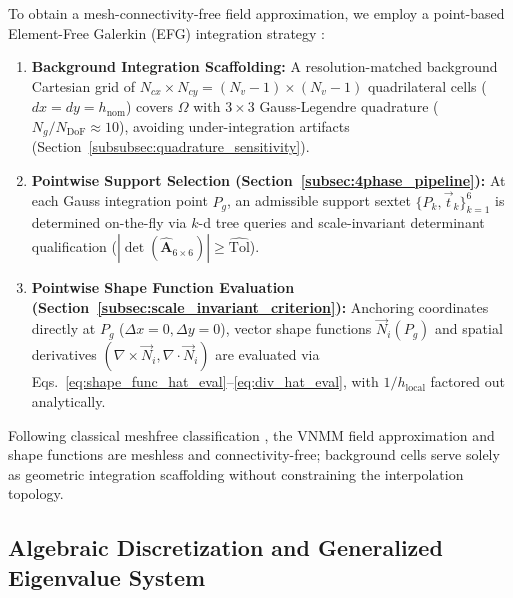 \documentclass[preprint,12pt]{elsarticle}
\begin{document}
To obtain a mesh-connectivity-free field approximation, we employ a point-based Element-Free Galerkin (EFG) integration strategy \cite{belytschko1994element, parreira2006efficient}:
\begin{enumerate}
    \item \textbf{Background Integration Scaffolding:} A resolution-matched background Cartesian grid of $N_{cx} \times N_{cy} = (N_v - 1) \times (N_v - 1)$ quadrilateral cells ($dx = dy = h_{\mathrm{nom}}$) covers $\Omega$ with $3 \times 3$ Gauss-Legendre quadrature ($N_g / N_{\mathrm{DoF}} \approx 10$), avoiding under-integration artifacts (Section~\ref{subsubsec:quadrature_sensitivity}).
    \item \textbf{Pointwise Support Selection (Section~\ref{subsec:4phase_pipeline}):} At each Gauss integration point $P_g$, an admissible support sextet $\{P_k, \vec{t}_k\}_{k=1}^6$ is determined on-the-fly via $k$-d tree queries and scale-invariant determinant qualification ($|\det(\widehat{\mathbf{A}}_{6 \times 6})| \ge \widehat{\mathrm{Tol}}$).
    \item \textbf{Pointwise Shape Function Evaluation (Section~\ref{subsec:scale_invariant_criterion}):} Anchoring coordinates directly at $P_g$ ($\Delta x = 0, \Delta y = 0$), vector shape functions $\vec{N}_i(P_g)$ and spatial derivatives $(\nabla \times \vec{N}_i, \nabla \cdot \vec{N}_i)$ are evaluated via Eqs.~\eqref{eq:shape_func_hat_eval}--\eqref{eq:div_hat_eval}, with $1/h_{\mathrm{local}}$ factored out analytically.
\end{enumerate}

Following classical meshfree classification \cite{belytschko1994element, atluri2002meshless, liu2009mesh}, the VNMM field approximation and shape functions are meshless and connectivity-free; background cells serve solely as geometric integration scaffolding without constraining the interpolation topology.

\subsection{Algebraic Discretization and Generalized Eigenvalue System}
\label{subsec:algebraic_system}
\end{document}
